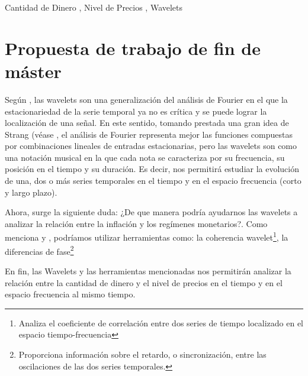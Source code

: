 \documentclass[a4paper,fleqn]{cas-sc}
\begin{document}
\begin{keywords}
    Cantidad de Dinero \sep
    Nivel de Precios \sep
    Wavelets
\end{keywords}

\maketitle


\section{Propuesta de trabajo de fin de máster}

Según \cite{Ramsey2016}, las wavelets son una generalización del análisis de Fourier en el que la estacionariedad de la serie temporal ya no es crítica y se puede lograr la localización de una señal. En este sentido, tomando prestada una gran idea de Strang (véase \cite{Strang1996}, el análisis de Fourier representa mejor las funciones compuestas por combinaciones lineales de entradas estacionarias, pero las wavelets son como una notación musical en la que cada nota se caracteriza por su frecuencia, su posición en el tiempo y su duración. Es decir, nos permitirá estudiar la evolución de una, dos o más series temporales en el tiempo y en el espacio frecuencia (corto y largo plazo). 

Ahora, surge la siguiente duda: ¿De que manera podría ayudarnos las wavelets a analizar la relación entre la inflación y los regímenes monetarios?. Como menciona \cite{AguiarConraria2008} y \cite{Jiang2015}, podríamos utilizar herramientas como: la coherencia wavelet\footnote[1]{Analiza el coeficiente de correlación entre dos series de tiempo localizado en el espacio tiempo-frecuencia}, la diferencias de fase\footnote[2]{Proporciona información sobre el retardo, o sincronización, entre las oscilaciones de las dos series temporales.} 

En fin, las Wavelets y las herramientas mencionadas nos permitirán analizar la relación entre la cantidad de dinero y el nivel de precios en el tiempo y en el espacio frecuencia al mismo tiempo.
\end{document}
